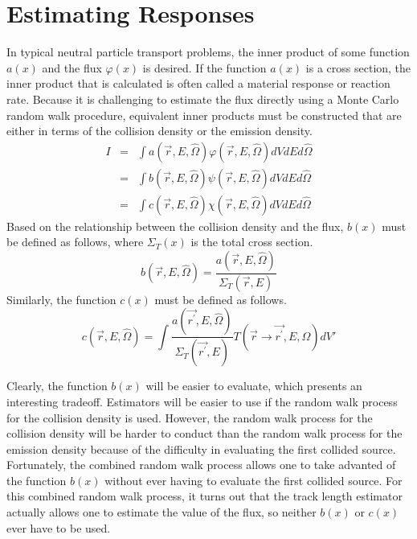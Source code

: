 \section{Estimating Responses}
In typical neutral particle transport problems, the inner product of some 
function $a(x)$ and the flux $\varphi(x)$ is desired. If the function $a(x)$ is
a cross section, the inner product that is calculated is often called a 
material response or reaction rate. Because it is challenging to estimate the
flux directly using a Monte Carlo random walk procedure, equivalent inner 
products must be constructed that are either in terms of the collision density 
or the emission density. 
\begin{eqnarray}
  I & = & \int a(\vec{r},E,\hat{\Omega}) \varphi(\vec{r},E,\hat{\Omega}) 
  dVdEd\hat{\Omega} \\
  & = & \int b(\vec{r},E,\hat{\Omega}) \psi(\vec{r},E,\hat{\Omega})  
  dVdEd\hat{\Omega} \\
  & = & \int c(\vec{r},E,\hat{\Omega}) \chi(\vec{r},E,\hat{\Omega}) 
  dVdEd\hat{\Omega}
\end{eqnarray}
Based on the relationship between the collision density and the flux, $b(x)$
must be defined as follows, where $\Sigma_T(x)$ is the total cross section.
\begin{equation}
  b(\vec{r},E,\hat{\Omega}) = \frac{a(\vec{r},E,\hat{\Omega})}
  {\Sigma_T(\vec{r},E)}
  \label{eq:collision_response_function}
\end{equation}
Similarly, the function $c(x)$ must be defined as follows.
\begin{equation}
  c(\vec{r},E,\hat{\Omega}) = \int \frac{a(\vec{r^{'}},E,\hat{\Omega})}
  {\Sigma_T(\vec{r^{'}},E)} T(\vec{r} \to \vec{r^{'}},E,\Omega)dV'
  \label{eq:emission_response_function}
\end{equation}

Clearly, the function $b(x)$ will be easier to evaluate, which presents an 
interesting tradeoff. Estimators will be easier to use if the random walk 
process for the collision density is used. However, the random walk process
for the collision density will be harder to conduct than the random walk 
process for the emission density because of the difficulty in evaluating the 
first collided source. Fortunately, the combined random walk process allows 
one to take advanted of the function $b(x)$ without ever having to evaluate
the first collided source. For this combined random walk process, it turns out 
that the track length estimator actually allows one to estimate the value of 
the flux, so neither $b(x)$ or $c(x)$ ever have to be used.

